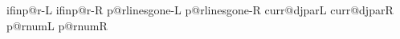 \def\restoreLRorig{%
  \trace{d}{restoreLRorig}%
  \let\wh@t\restoreLR@rig\pr@cessSpecificDim
  \let\wh@t\restoreLR@rig\pr@cessSpecificCount
}
  

\newdimen\FontSizeUnitL\FontSizeUnitL=-1sp\newdimen\FontSizeUnitR\FontSizeUnitR=-1sp
\newdimen\le@dingunitL\le@dingunitL=-1sp\newdimen\le@dingunitR\le@dingunitR=-1sp
\newdimen\onel@neunitL\onel@neunitL=-1sp\newdimen\onel@neunitR\onel@neunitR=-1sp
\newdimen\verticalsp@ceunitL\verticalsp@ceunitL=-1sp\newdimen\verticalsp@ceunitR\verticalsp@ceunitR=-1sp
\newdimen\IndentUnitL\IndentUnitL=-1sp\newdimen\IndentUnitR\IndentUnitR=-1sp
\def\SpaceStretchFactorL{}\def\SpaceStretchFactorR{}
\def\SpaceShrinkFactorL{}\def\SpaceShrinkFactorR{}
\newif\ifRTLL \newif\ifRTLR
\x@\newif\csname ifinp@r-L\endcsname %
\x@\newif\csname ifinp@r-R\endcsname %
\x@\newcount\csname p@rlinesgone-L\endcsname %
\x@\newcount\csname p@rlinesgone-R\endcsname %
\x@\newcount\csname curr@djparL\endcsname %
\x@\newcount\csname curr@djparR\endcsname %
\x@\newcount\csname p@rnumL\endcsname %
\x@\newcount\csname p@rnumR\endcsname %
\newcount\@numcutsL %
\newcount\@numcutsR %
\newcount\dropped@ther@linesL %
\newcount\dropped@ther@linesR %

\def\xdef@cseq#1#2{\x@\xdef\csname #1\endcsname{#2}}%
\def\def@cseq#1#2{\x@\def\csname #1\endcsname{#2}}%
\def\empty@cseq#1{\x@\xdef\csname #1\endcsname{}}%
\def\newsideSpecificIf#1{%
  \x@\def\csname #1true\endcsname{\x@\let\csname if#1\endcsname\iftrue}%
  \x@\def\csname #1false\endcsname{\x@\let\csname if#1\endcsname\iffalse}%
  \x@\def\csname #1default\endcsname{\x@\let\csname if#1\endcsname\undefined}%
}

